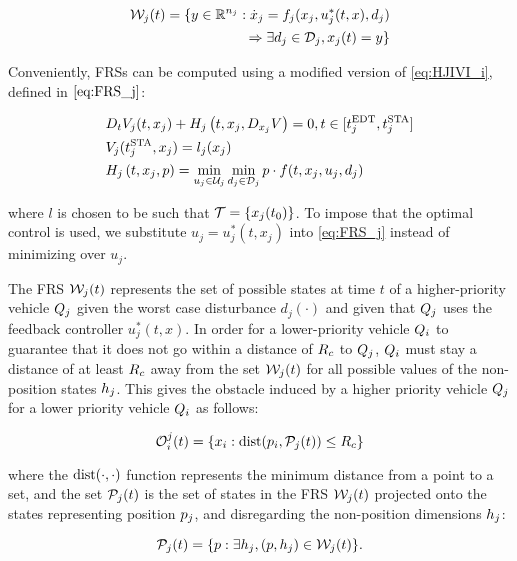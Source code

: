 \begin{equation}
\label{eq:frs}
\begin{aligned}
\mathcal{W}_j(t) = \{y \in \mathbb{R}^{n_j}: \dot{x}_j = f_j(x_j, u_j^*(t, x), d_j) \\
\Rightarrow \exists d_j \in \mathcal{D}_j, x_j(t) = y\}
\end{aligned}
\end{equation}

Conveniently, FRSs can be computed using a modified version of \eqref{eq:HJIVI_i}, defined in $\eqref{eq:FRS_j}$:

\begin{equation}
\label{eq:FRS_j}
\begin{aligned}
&D_t V_j(t, x_j) + H_j\left(t, x_j, D_{x_j} V\right) = 0, t \in [t^\text{EDT}_j, t^\text{STA}_j]\\
&V_j(t^\text{STA}_j, x_j) =l_j(x_j) \\
&H_j\left(t, x_j, p\right) = \min_{u_j \in \mathcal{U}_j} \min_{d_j \in \mathcal{D}_j} p \cdot f(t, x_j, u_j, d_j)
\end{aligned}
\end{equation}

\noindent where $l$ is chosen to be such that $\mathcal{T} = \{x_j(t_0)\}$. To impose that the optimal control is used, we substitute $u_j = u_j^*(t, x_j)$ into \eqref{eq:FRS_j} instead of minimizing over $u_j$. 

The FRS $\mathcal{W}_j(t)$ represents the set of possible states at time $t$ of a higher-priority vehicle $Q_j$ given the worst case disturbance $d_j(\cdot)$ and given that $Q_j$ uses the feedback controller $u_j^*(t, x)$. In order for a lower-priority vehicle $Q_i$ to guarantee that it does not go within a distance of $R_c$ to $Q_j$, $Q_i$ must stay a distance of at least $R_c$ away from the set $\mathcal{W}_j(t)$ for all possible values of the non-position states $h_j$. This gives the obstacle induced by a higher priority vehicle $Q_j$ for a lower priority vehicle $Q_i$ as follows:

\begin{equation}
\mathcal{O}_i^j(t) = \{x_i: \text{dist}(p_i, \mathcal{P}_j(t)) \le R_c \}
\end{equation}

\noindent where the $\text{dist}(\cdot, \cdot)$ function represents the minimum distance from a point to a set, and the set $\mathcal{P}_j(t)$ is the set of states in the FRS $\mathcal{W}_j(t)$ projected onto the states representing position $p_j$, and disregarding the non-position dimensions $h_j$:

\begin{equation}
\mathcal{P}_j(t) = \{p: \exists h_j, (p, h_j) \in \mathcal{W}_j(t)\}.
\end{equation}


